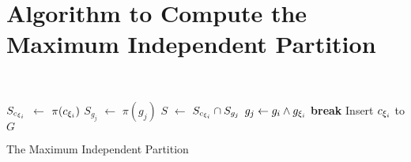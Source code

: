 
\newcommand{\vvv}{\vspace*{-3pt}}


\section{Algorithm to Compute the Maximum Independent Partition}
\label{appendix:partition}
~
{\small
\IncMargin{1em}
\begin{algorithm}[h]\small
    \DontPrintSemicolon
    {
        $S_{c_{{\xi}_{i}}}$ $\leftarrow$ $\pi(c_{{\xi}_{i}})$ \;
        {
            $S_{g_j}$ $\leftarrow$ $\pi(g_{j})$ \;
            $S$ $\leftarrow$ $S_{c_{{\xi}_{i}}} \cap S_{g_j}$  \;
            {
                $g_{j} \leftarrow g_{i} \land g_{{\xi}_{i}}$ \;
                \textbf{break} \;
            }
            Insert $c_{{\xi}_{i}}$ to $G$
        }
    }
    \caption{The Maximum Independent Partition}
    \label{algo:max-inde}
\end{algorithm}
\DecMargin{1em}
}
~
